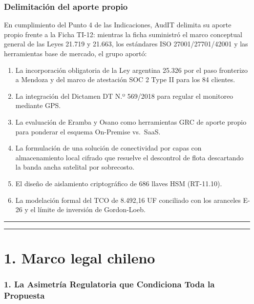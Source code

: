 \subsubsection{Delimitación del aporte propio}\label{delimitaciuxf3n-del-aporte-propio}

En cumplimiento del Punto 4 de las Indicaciones, AudIT delimita su aporte propio frente a la Ficha TI-12: mientras la ficha suministró el marco conceptual general de las Leyes 21.719 y 21.663, los estándares ISO 27001/27701/42001 y las herramientas base de mercado, el grupo aportó:

\begin{enumerate}
\def\labelenumi{\arabic{enumi}.}
\tightlist
\item
  La incorporación obligatoria de la Ley argentina 25.326 por el paso fronterizo a Mendoza y del marco de atestación SOC 2 Type II para los 84 clientes.
\item
  La integración del Dictamen DT N.º 569/2018 para regular el monitoreo mediante GPS.
\item
  La evaluación de Eramba y Osano como herramientas GRC de aporte propio para ponderar el esquema On-Premise vs.~SaaS.
\item
  La formulación de una solución de conectividad por capas con almacenamiento local cifrado que resuelve el descontrol de flota descartando la banda ancha satelital por sobrecosto.
\item
  El diseño de aislamiento criptográfico de 686 llaves HSM (RT-11.10).
\item
  La modelación formal del TCO de 8.492,16 UF conciliado con los aranceles E-26 y el límite de inversión de Gordon-Loeb.
\end{enumerate}

\begin{center}\rule{0.5\linewidth}{0.5pt}\end{center}

\begin{center}\rule{0.5\linewidth}{0.5pt}\end{center}

\section{1. Marco legal chileno}\label{marco-legal-chileno}

\subsubsection{1. La Asimetría Regulatoria que Condiciona Toda la Propuesta}\label{la-asimetruxeda-regulatoria-que-condiciona-toda-la-propuesta}

